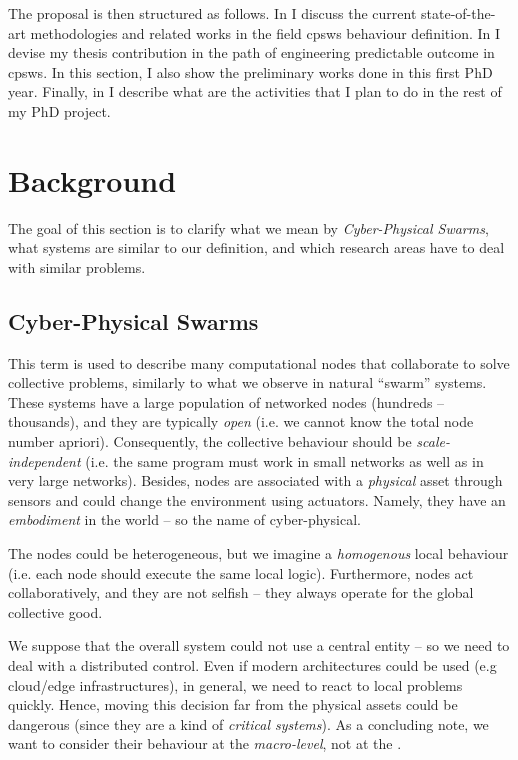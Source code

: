 \documentclass[11pt]{article}
\begin{document}
The proposal is then structured as follows. In  I discuss the current state-of-the-art methodologies and related works in the field \acp{cpsw} behaviour definition.
%
In  I devise my thesis contribution in the path of engineering predictable outcome in \acp{cpsw}. 
%
In this section, I also show the preliminary works done in this first PhD year.
%
Finally, in  I describe what are the activities that I plan to do in the rest of my PhD project.

\section{Background} \label{background}
The goal of this section is to clarify what we mean by \textit{Cyber-Physical Swarms}, what systems are similar to our definition, and which research areas have to deal with similar problems.
\subsection{Cyber-Physical Swarms}
This term is used to describe many computational nodes that collaborate to solve collective problems, similarly to what we observe in natural ``swarm'' systems.
%
These systems have a large population of networked nodes (hundreds -- thousands), and they are typically \textit{open} (i.e. we cannot know the total node number apriori). 
%
Consequently, the collective behaviour should be \textit{scale-independent} (i.e. the same program must work in small networks as well as in very large networks).
%
Besides, nodes are associated with a \textit{physical} asset through sensors and could change the environment using actuators. 
%
Namely, they have an \emph{embodiment} in the world -- so the name of cyber-physical. 

The nodes could be heterogeneous, but we imagine a \emph{homogenous} local behaviour (i.e. each node should execute the same local logic). 
%
Furthermore, nodes act collaboratively, and they are not selfish -- they always operate for the global collective good.

We suppose that the overall system could not use a central entity -- so we need to deal with a distributed control. 
%
Even if modern architectures could be used (e.g cloud/edge infrastructures), in general, we need to react to local problems quickly. 
%
Hence, moving this decision far from the physical assets could be dangerous (since they are a kind of \emph{critical systems}).
%
As a concluding note, we want to consider their behaviour at the \textit{macro-level}, not at the . 
\end{document}
